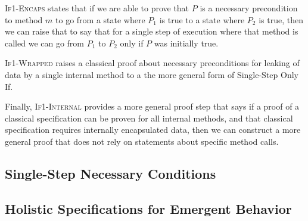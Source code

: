 \textsc{If1-Encaps} states that if we are able to prove that $P$ is 
a necessary precondition to method $m$ to go from a state where 
$P_1$ is true to a state where $P_2$ is true, then we can raise 
that to say that for a single step of execution where that method 
is called we can go from $P_1$ to $P_2$ only if $P$ was initially true.

\textsc{If1-Wrapped} raises a classical proof about necessary preconditions 
for leaking of data by a single internal method to a the more general form of 
Single-Step Only If.

Finally, \textsc{If1-Internal} provides a more general proof step that says
if a proof of a classical specification can be proven for all internal 
methods, and that classical specification requires internally encapsulated
data, then we can construct a more general proof that does not rely on
statements about specific method calls.

\subsection{Single-Step Necessary Conditions}
\label{s:singleStep-proof}

\subsection{Holistic Specifications for Emergent Behavior}
\label{s:emergent-proof}

